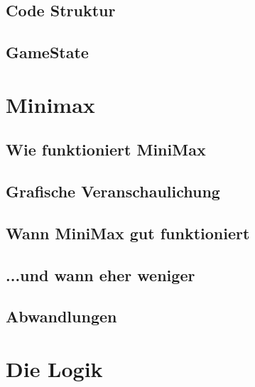 \documentclass[12pt]{beamer}
\begin{document}
\subsection{Code Struktur} \begin{frame}\end{frame}
\subsection{GameState} \begin{frame}\end{frame}

\section{Minimax}
\subsection{Wie funktioniert MiniMax} \begin{frame}\end{frame}
\subsection{Grafische Veranschaulichung} \begin{frame}\end{frame}
\subsection{Wann MiniMax gut funktioniert} \begin{frame}\end{frame}
\subsection{...und wann eher weniger} \begin{frame}\end{frame}
\subsection{Abwandlungen} \begin{frame}\end{frame}

\section{Die Logik}
\end{document}
